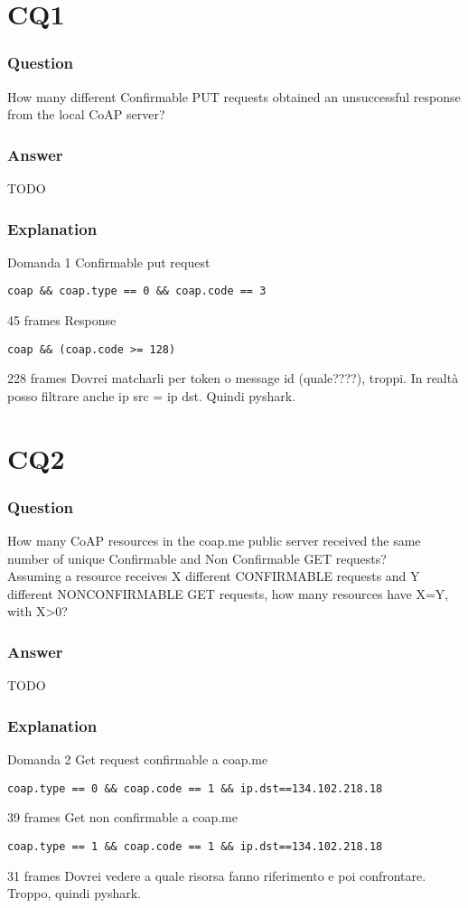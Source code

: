 \section{CQ1}
\subsubsection{Question}
How many different Confirmable PUT requests obtained an unsuccessful response from the local CoAP server?

\subsubsection{Answer}
TODO 

\subsubsection{Explanation}
Domanda 1
Confirmable put request 
\begin{verbatim}
coap && coap.type == 0 && coap.code == 3
\end{verbatim}
45 frames
Response 
\begin{verbatim}
coap && (coap.code >= 128)
\end{verbatim}
228 frames 
Dovrei matcharli per token o message id (quale????), troppi.
In realtà posso filtrare anche ip src = ip dst.
Quindi pyshark.

\section{CQ2}
\subsubsection{Question}
How many CoAP resources in the coap.me public server received the same number of unique Confirmable and Non Confirmable GET requests?\\
Assuming a resource receives X different CONFIRMABLE requests and Y different NONCONFIRMABLE GET requests, how many resources have X=Y, with X>0?

\subsubsection{Answer}
TODO 

\subsubsection{Explanation}
Domanda 2
Get request confirmable a coap.me
\begin{verbatim}
coap.type == 0 && coap.code == 1 && ip.dst==134.102.218.18
\end{verbatim}
39 frames
Get non confirmable a coap.me
\begin{verbatim}
coap.type == 1 && coap.code == 1 && ip.dst==134.102.218.18
\end{verbatim}
31 frames
Dovrei vedere a quale risorsa fanno riferimento e poi confrontare.
Troppo, quindi pyshark.

